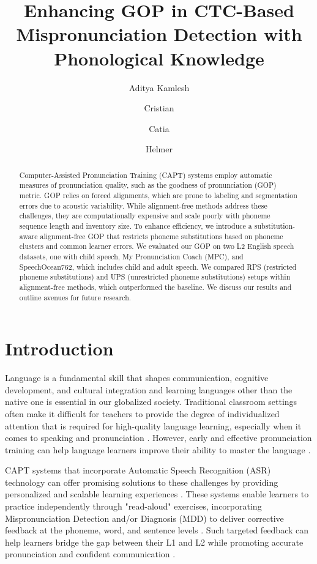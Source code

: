 \documentclass{Interspeech}
\title{Enhancing GOP in CTC-Based Mispronunciation Detection with Phonological Knowledge}
\author{Aditya Kamlesh}{Parikh}
\author{Cristian}{Tejedor-Garcia}
\author{Catia}{Cucchiarini}
\author{Helmer}{Strik}
\affiliation[nocounter]{Centre for Language Studies}{Radboud University}{the Netherlands}
\begin{document}
\maketitle

\begin{abstract}

Computer-Assisted Pronunciation Training (CAPT) systems employ automatic measures of pronunciation quality, such as the goodness of pronunciation (GOP) metric. GOP relies on forced alignments, which are prone to labeling and segmentation errors due to acoustic variability. While alignment-free methods address these challenges, they are computationally expensive and scale poorly with phoneme sequence length and inventory size. To enhance efficiency, we introduce a substitution-aware alignment-free GOP that restricts phoneme substitutions based on phoneme clusters and common learner errors. We evaluated our GOP on two L2 English speech datasets, one with child speech, My Pronunciation Coach (MPC), and SpeechOcean762, which includes child and adult speech. We compared RPS (restricted phoneme substitutions) and UPS (unrestricted phoneme substitutions) setups within alignment-free methods, which outperformed the baseline. We discuss our results and outline avenues for future research.
    
\end{abstract}




\section{Introduction}

Language is a fundamental skill that shapes communication, cognitive development, and cultural integration \cite{nardon2012language} and learning languages other than the native one is essential in our globalized society. Traditional classroom settings often make it difficult for teachers to provide the degree of individualized attention that is required for high-quality language learning, especially when it comes to speaking and pronunciation \cite{onyishi2020teachers, neri2002feedback}. However, early and effective pronunciation training can help language learners improve their ability to master the language \cite{cucchiarini2009oral}.


CAPT systems that incorporate Automatic Speech Recognition (ASR) technology can offer promising solutions to these challenges by providing personalized and scalable learning experiences \cite{cucchiarini2009oral, neri2006asr}. These systems enable learners to practice independently through "read-aloud" exercises, incorporating Mispronunciation Detection and/or Diagnosis (MDD) to deliver corrective feedback at the phoneme, word, and sentence levels \cite{Amrate_Tsai_2025, liu2016teaching}. Such targeted feedback can help learners bridge the gap between their L1 and L2 while promoting accurate pronunciation and confident communication \cite{silpachai2024corrective, doremalen2013automatic}.
\end{document}
